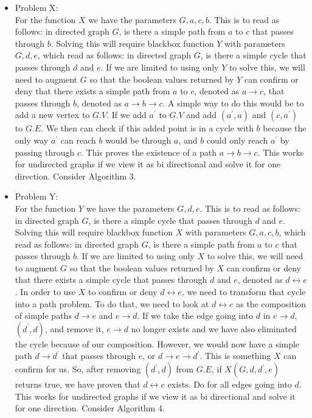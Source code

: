 \documentclass[11pt]{article}
\begin{document}
\bigskip


\begin{itemize}
\item Problem X:\\
For the function $X$ we have the parameters $G, a, c, b$. This is to read as follows: in directed graph $G$, is there a simple path from $a$ to $c$ that passes through $b$. Solving this will require blackbox function $Y$ with parameters $G, d, e$, which read as follows: in directed graph $G$, is there a simple cycle that passes through $d$ and $e$. If we are limited to using only $Y$ to solve this, we will need to augment $G$ so that the boolean values returned by $Y$ can confirm or deny that there exists a simple path from $a$ to $c$, denoted as $a\rightarrow c$, that passes through $b$, denoted as $a\rightarrow b\rightarrow c$. A simple way to do this would be to add a new vertex to $G.V$. If we add $a^\prime$ to $G.V$ and add $(a^\prime,a)$ and $(c,a^\prime)$ to $G.E$. We then can check if this added point is in a cycle with $b$ because the only way $a^\prime$ can reach $b$ would be through $a$, and $b$ could only reach $a^\prime$ by passing through $c$. This proves the existence of a path $a\rightarrow b\rightarrow c$. This works for undirected graphs if we view it as bi directional and solve it for one direction. Consider Algorithm 3.
\item Problem Y:\\
For the function $Y$ we have the parameters $G, d, e$. This is to read as follows: in directed graph $G$, is there a simple cycle that passes through $d$ and $e$. Solving this will require blackbox function $X$ with parameters $G, a, c, b$, which read as follows: in directed graph $G$, is there a simple path from $a$ to $c$ that passes through $b$. If we are limited to using only $X$ to solve this, we will need to augment $G$ so that the boolean values returned by $X$ can confirm or deny that there exists a simple cycle that passes through $d$ and $e$, denoted as $d \leftrightarrow e$. In order to use $X$ to confirm or deny $d \leftrightarrow e$, we need to transform that cycle into a path problem. To do that, we need to look at $d \leftrightarrow e $ as the composition of simple paths $d \rightarrow e$ and $e \rightarrow d$. If we take the edge going into $d$ in $e \rightarrow d$, $(d^\prime,d)$, and remove it, $e \rightarrow d$ no longer exists and we have also eliminated the cycle because of our composition. However, we would now have a simple path $d \rightarrow d^\prime$ that passes through $e$, or $d \rightarrow e \rightarrow d^\prime$. This is something $X$ can confirm for us. So, after removing $(d^\prime,d)$ from $G.E$, if $X(G,d,d^\prime,e)$ returns true, we have proven that $d \leftrightarrow e$ exists. Do for all edges going into $d$. This works for undirected graphs if we view it as bi directional and solve it for one direction. Consider Algorithm 4.
\end{itemize}
\end{document}
